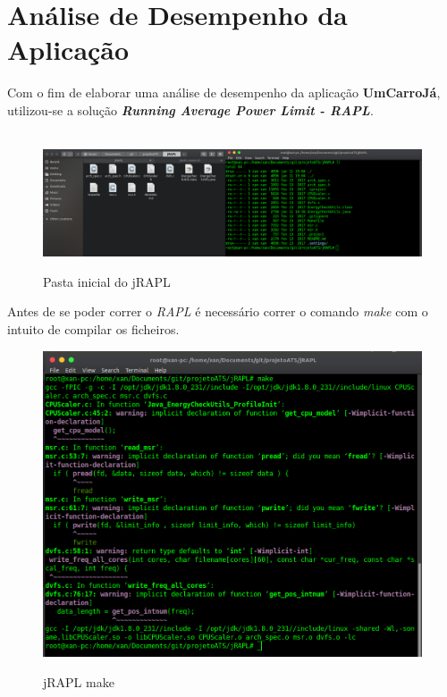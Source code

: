 \vspace{1cm}
\section{Análise de Desempenho da Aplicação}

Com o fim de elaborar uma análise de desempenho da aplicação \textbf{UmCarroJá}, utilizou-se a solução \textit{\textbf{Running Average Power Limit - RAPL}}.

\begin{figure}[H]
    \hbox{\hspace{-8em} \includegraphics[width=1.5\textwidth]{images/rapl_inicial.png}}
    \label{fig47}
    \caption{Pasta inicial do jRAPL}
\end{figure}

Antes de se poder correr o \textit{RAPL} é necessário correr o comando \textit{make} com o intuito de compilar os ficheiros.

\begin{figure}[H]
    \centering
    \includegraphics[width=1\textwidth]{images/rapl_make.png}
    \label{fig48}
    \caption{jRAPL make}
\end{figure}

